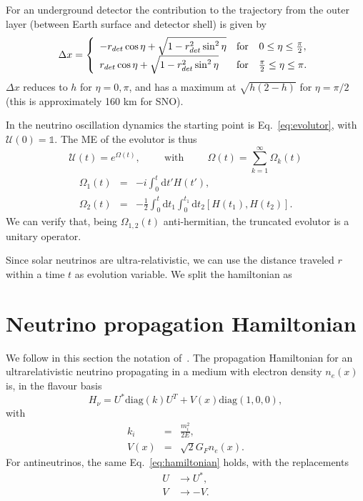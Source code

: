 \documentclass{article}
\newcommand{\de}[0]{\text{d}}
\begin{document}
For an underground detector the contribution to the trajectory from the outer layer (between Earth surface and detector shell) is given by
\begin{equation}
	 \Delta x = \left\{ \begin{array}{l c c}
		-r_{det} \cos\eta + \sqrt{1 - r_{det}^2 \sin^2 \eta} & \text{for} & 0 \leq \eta \leq \frac{\pi}{2}, \\
		r_{det} \cos\eta + \sqrt{1 - r_{det}^2 \sin^2 \eta} & \text{for} & \frac{\pi}{2} \leq \eta \leq \pi.
	\end{array} \right.
\end{equation}
$\Delta x$ reduces to $h$ for $\eta=0, \pi$, and has a maximum at $\sqrt{h(2-h)}$ for $\eta=\pi/2$ (this is approximately 160 km for SNO).

In the neutrino oscillation dynamics the starting point is Eq.~\ref{eq:evolutor}, with ${\mathcal{U}(0) = \mathbb{1}}$. The ME of the evolutor is thus
\begin{equation}
	\mathcal{U}(t) = e^{\Omega(t)},\hspace{1cm} \text{with} \hspace{1cm} \Omega(t) = \sum_{k=1}^\infty \Omega_k (t)
\end{equation}
\begin{eqnarray}
	\Omega_1(t) &=& -i \int_0^t \de t' H(t'), \label{eq:ME1}\\
	\Omega_2(t) &=& -\frac{1}{2} \int_0^t \de t_1 \int_0^{t_1} \de t_2 \left[ H(t_1), H(t_2) \right]. \label{eq:ME2}
\end{eqnarray}
We can verify that, being $\Omega_{1,2}(t)$ anti-hermitian, the truncated evolutor is a unitary operator.

Since solar neutrinos are ultra-relativistic, we can use the distance traveled $r$ within a time $t$ as evolution variable. We split the hamiltonian as

\section{Neutrino propagation Hamiltonian}
We follow in this section the notation of~\cite{Fantini:2018itu}.
The propagation Hamiltonian for an ultrarelativistic neutrino propagating in a medium with electron density $n_e(x)$ is, in the flavour basis
\begin{equation}\label{eq:hamiltonian}
	H_\nu = U^* \text{diag}(k) U^T + V(x) \text{diag}(1,0,0),
\end{equation}
with
\begin{eqnarray}
	k_i &=& \frac{m_i^2}{2E},\\
	V(x) &=& \sqrt{2}G_F n_e(x).
\end{eqnarray}
For antineutrinos, the same Eq.~\ref{eq:hamiltonian} holds, with the replacements
\begin{eqnarray}
	U &\rightarrow U^*,\\
	V &\rightarrow -V.
\end{eqnarray}
\end{document}
